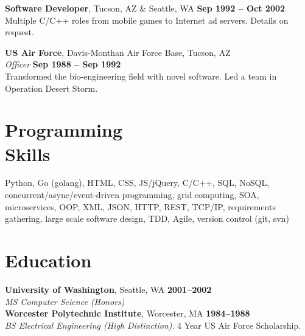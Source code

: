 \documentclass[margin,line]{resume}
\begin{document}
\begin{resume}
    \textbf{Software Developer}, Tucson, AZ \& Seattle, WA \hfill \textbf{Sep 1992 -- Oct 2002}\\
	Multiple C/C++ roles from mobile games to Internet ad servers. Details on request. 
	
    \textbf{US Air Force}, Davis-Monthan Air Force Base, Tucson, AZ\\
    \textsl{Officer} \hfill \textbf{Sep 1988 -- Sep 1992}\\
    Transformed the bio-engineering field with novel software. Led a team in Operation Desert Storm.
	
    \section{\mysidestyle Programming\\Skills} 

    Python, Go (golang), HTML, CSS, JS/jQuery, C/C++, SQL, NoSQL, concurrent/async/event-driven programming, grid computing, 
    SOA, microservices, OOP, XML, JSON, HTTP, REST, TCP/IP, requirements gathering, large scale software design, TDD,  
    Agile, version control (git, svn)

    \section{\mysidestyle Education}
	\textbf{University of Washington}, Seattle, WA \hfill \textbf{2001--2002}\\
	\textsl{MS Computer Science (Honors)} \\
	\textbf{Worcester Polytechnic Institute}, Worcester, MA \hfill \textbf{1984--1988}\\
	\textsl{BS Electrical Engineering (High Distinction)}. 4 Year US Air Force Scholarship. 
    

\end{resume}
\end{document}
